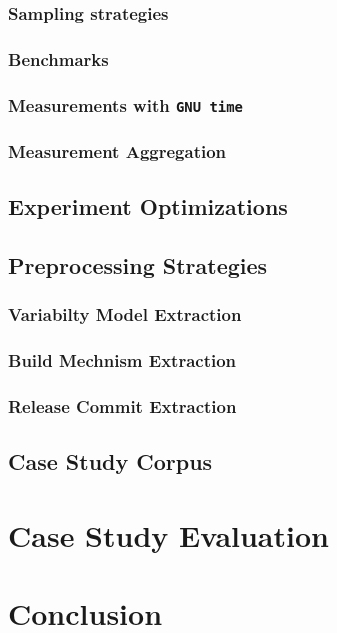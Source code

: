 \documentclass[
	12pt,
	a4paper,
	oneside,
	openright
]{book}
\begin{document}
\subsection{Sampling strategies}
\subsection{Benchmarks}
\subsection{Measurements with \texttt{GNU time}}
\subsection{Measurement Aggregation}



\section{Experiment Optimizations}

\section{Preprocessing Strategies}
\subsection{Variabilty Model Extraction}
\subsection{Build Mechnism Extraction}
\subsection{Release Commit Extraction}

\section{Case Study Corpus}

\chapter{Case Study Evaluation} \label{chapter:4} 
\chapter{Conclusion}\label{chapter:5}

\clearpage


\end{document}
